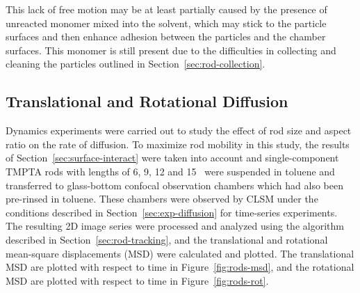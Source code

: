 This lack of free motion may be at least partially caused by the presence of unreacted monomer 
mixed into the solvent, which may stick to the particle surfaces and then enhance adhesion between the
particles and the chamber surfaces.  This monomer is still present due to the difficulties in 
collecting and cleaning the particles outlined in Section~\ref{sec:rod-collection}.

\subsection{Translational and Rotational Diffusion}
\label{sec:rod-diffusion-results}




Dynamics experiments were carried out to study the effect of rod size and aspect ratio on the rate of
diffusion.  To maximize rod mobility in this study, the results of Section~\ref{sec:surface-interact}
were taken into account and single-component TMPTA 
rods with lengths of 6, 9, 12 and 15 \microns~were suspended in toluene and transferred 
to glass-bottom confocal observation chambers which had 
also been
pre-rinsed in toluene.  These chambers were observed by CLSM under the conditions described in 
Section~\ref{sec:exp-diffusion} for time-series experiments.  The resulting 2D image series were 
processed and analyzed using the algorithm described in Section~\ref{sec:rod-tracking}, and 
the translational and rotational mean-square displacements (MSD) were calculated and plotted.
The translational MSD are plotted with respect to time in Figure~\ref{fig:rods-msd}, and the 
rotational MSD are plotted with respect to time in Figure~\ref{fig:rods-rot}.


